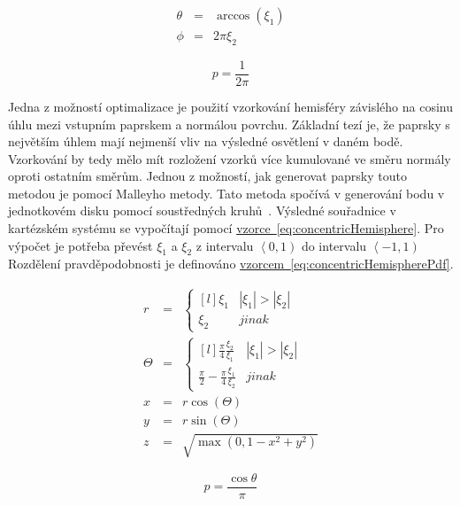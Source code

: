 \documentclass[czech,master]{diploma}
\newcommand{\intervalco}[2]{\left<{{#1},{#2}}\right)}
\newcommand{\randU}{\xi_{1}}
\newcommand{\randV}{\xi_{2}}
\begin{document}
\begin{eqnarray}
  \theta & = & \arccos(\randU) \nonumber \\
  \phi & = & 2\pi\randV \label{eq:hemisphereSampling}
\end{eqnarray}

\begin{equation} \label{eq:hemisphereSamplingPdf}
  p = \frac{1}{2\pi}
\end{equation}

Jedna z možností optimalizace je použití vzorkování hemisféry závislého na cosinu úhlu mezi vstupním paprskem a normálou povrchu. Základní tezí je, že paprsky s největším úhlem mají nejmenší vliv na výsledné osvětlení v daném bodě. Vzorkování by tedy mělo mít rozložení vzorků více kumulované ve směru normály oproti ostatním směrům. Jednou z možností, jak generovat paprsky touto metodou je pomocí Malleyho metody. Tato metoda spočívá v generování bodu v jednotkovém disku pomocí soustředných kruhů~\cite{PHARR2017747}. Výsledné souřadnice v kartézském systému se vypočítají pomocí \hyperref[eq:concentricHemisphere]{vzorce~\ref{eq:concentricHemisphere}}. Pro výpočet je potřeba převést \(\randU\) a \(\randV\) z intervalu \(\intervalco{0}{1}\) do intervalu \(\intervalco{-1}{1}\)  Rozdělení pravděpodobnosti je definováno \hyperref[eq:concentricHemisphere]{vzorcem~\ref{eq:concentricHemispherePdf}}.

\begin{eqnarray}
  r & = & \left\{\begin{matrix*}[l] \randU & |\randU| > \left | \randV \right |\\ \randV & jinak \end{matrix*}\right. \nonumber \\
  \Theta & = & \left\{\begin{matrix*}[l] \frac{\pi}{4}\frac{\randV}{\randU} & |\randU| > \left | \randV \right |\\ \frac{\pi}{2}-\frac{\pi}{4}\frac{\randU}{\randV} & jinak \end{matrix*}\right. \nonumber \\
  x & = &r\cos(\Theta)\nonumber \\
  y & = &r\sin(\Theta)\nonumber \\
  z & = &\sqrt{ \max(0, 1 - x^2 + y^2) }\label{eq:concentricHemisphere}
\end{eqnarray}

\begin{equation} \label{eq:concentricHemispherePdf}
  p = \frac{\cos\theta}{\pi}
\end{equation}
\end{document}

